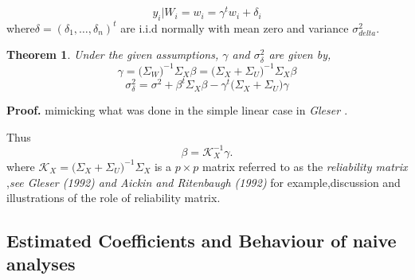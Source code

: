 \documentclass[12pt]{report}
\newtheorem{theoreme}{Theorem}[section] %
\begin{document}
\begin{equation}
	y_{i}|W_{i}=w_{i}=\gamma^{t}w_{i}+\delta_{i}
	\label{f49}
\end{equation}
where$\delta=(\delta_{1},\dots,\delta_{n})^{t}$ are i.i.d normally with mean zero and variance $\sigma^{2}_{delta}$.
\begin{theoreme}
	Under the given assumptions, $\gamma$ and $\sigma_{\delta}^{2}$ are given by,
	\begin{equation}
				\gamma=\big(\Sigma_{W}\big)^{-1}\Sigma_{X}\beta=\big(\Sigma_{X}+\Sigma_{U}\big)^{-1}\Sigma_{X}\beta
				\label{gam}
	\end{equation}
	\begin{equation}
	\sigma_{\delta}^{2}= \sigma^{2}+\beta^{t}\Sigma_{X}\beta-\gamma^{t}\big(\Sigma_{X}+\Sigma_{U}\big)\gamma
\end{equation}
\end{theoreme}

\textbf{Proof.} mimicking what was done in the simple linear case in \textit{Gleser \cite{nref4}}.

Thus
\begin{equation}
	\beta=\mathcal{K}_{X}^{-1}\gamma.
	\label{f50}
\end{equation}
where $\mathcal{K}_{X}=\big(\Sigma_{X}+\Sigma_{U}\big)^{-1}\Sigma_{X}$ is a $p\times p$ matrix  referred to as the \textit{reliability matrix} ,\textit{see Gleser (1992) \cite{nref4}  and Aickin and Ritenbaugh (1992)} for example,discussion and illustrations of the role of reliability matrix.
\begin{center}
	\subsection{Estimated Coefficients and Behaviour of naive analyses}
\end{center}
\end{document}
